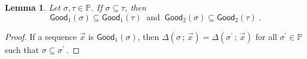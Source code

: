 \documentclass[10pt,a4paper, openany,  oldfontcommands]{memoir}
\newtheorem{lemma} [theorem] {Lemma}
\newtheorem{open problem} [theorem] {Open Problem}
\begin{document}
 
 
 
 
 
 
 
 
 
 
 
 
 
 
 
 
 
 

\begin{lemma}  \label{FirstLemmaGood}
Let  $  \sigma ,  \tau   \in  \mathbb{P} $. 
If  $  \sigma   \subseteq   \tau  $,  then   
\[
     \mathsf{Good}_1  \left(   \sigma  \right)    \subseteq     \mathsf{Good}_1  \left(   \tau  \right)        
     \     \mbox{  and   }     \    
     \mathsf{Good}_2  \left(   \sigma  \right)    \subseteq     \mathsf{Good}_2  \left(   \tau  \right)     
     \               .
\]     
\end{lemma} 
\begin{proof}

If   a sequence  $  \vec{x}  $   is    $  \mathsf{Good}_1  \left(   \sigma  \right)     $, 
then    $  \Delta  \left(  \sigma  \,  ;  \,     \vec{x}  \right)     =  \Delta  \left(  \sigma^{  \prime }   \,  ;  \,     \vec{x}  \right)             $
for all   $  \sigma^{  \prime }   \in   \mathbb{P} $  such that  $  \sigma  \subseteq  \sigma^{  \prime }       \,      $. 
\end{proof}
\end{document}
